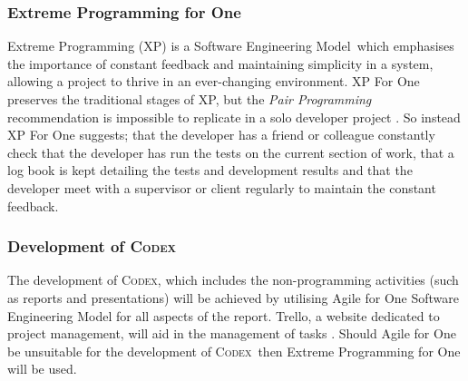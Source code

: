 \documentclass[final]{cmpreport}
\newcommand{\sem}{Software Engineering Model}
\newcommand{\Codex}{\textsc{Codex}}
\begin{document}
	\subsubsection{Extreme Programming for One}
	Extreme Programming (XP) is a \sem \ which emphasises the importance of constant feedback and maintaining simplicity in a system, allowing a project to thrive in an ever-changing environment. XP For One preserves the traditional stages of XP, but the \emph{Pair Programming} recommendation is impossible to replicate in a solo developer project \citep{SoloXP}. So instead XP For One suggests; that the developer has a friend or colleague constantly check that the developer has run the tests on the current section of work, that a log book is kept detailing the tests and development results and that the developer meet with a supervisor or client regularly to maintain the constant feedback. 
	
	\subsubsection{Development of \Codex}
	The development of \Codex, which includes the non-programming activities (such as reports and presentations) will be achieved by utilising Agile for One Software Engineering Model for all aspects of the report. Trello, a website dedicated to project management, will aid in the management of tasks \citep{Trello}. Should Agile for One be unsuitable for the development of \Codex \ then Extreme Programming for One will be used.
	
	\clearpage 
	
\end{document}
